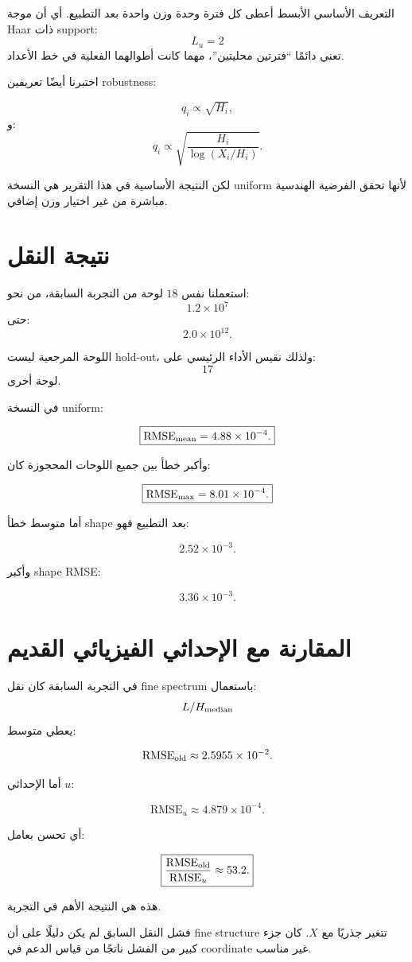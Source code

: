 \documentclass[12pt]{article}
\begin{document}
التعريف الأساسي الأبسط أعطى كل فترة وحدة وزن واحدة بعد التطبيع.
أي أن موجة Haar ذات support:
\[
L_u=2
\]
تعني دائمًا ``فترتين محليتين''، مهما كانت أطوالهما الفعلية في خط الأعداد.

اختبرنا أيضًا تعريفين robustness:

\[
q_i\propto\sqrt{H_i},
\]
و:
\[
q_i
\propto
\sqrt{
\frac{H_i}{
\log(X_i/H_i)
}
}.
\]

لكن النتيجة الأساسية في هذا التقرير هي النسخة uniform لأنها تحقق الفرضية
الهندسية مباشرة من غير اختيار وزن إضافي.

\section{نتيجة النقل}

استعملنا نفس \(18\) لوحة من التجربة السابقة، من نحو:
\[
1.2\times10^7
\]
حتى:
\[
2.0\times10^{12}.
\]

اللوحة المرجعية ليست hold-out، ولذلك نقيس الأداء الرئيسي على:
\[
17
\]
لوحة أخرى.

في النسخة uniform:

\[
\boxed{
\mathrm{RMSE}_{\rm mean}
=
4.88\times10^{-4}.
}
\]

وأكبر خطأ بين جميع اللوحات المحجوزة كان:

\[
\boxed{
\mathrm{RMSE}_{\rm max}
=
8.01\times10^{-4}.
}
\]

أما متوسط خطأ shape بعد التطبيع فهو:

\[
\boxed{
2.52\times10^{-3}.
}
\]

وأكبر shape RMSE:

\[
3.36\times10^{-3}.
\]

\section{المقارنة مع الإحداثي الفيزيائي القديم}

في التجربة السابقة كان نقل fine spectrum باستعمال:
\[
L/H_{\rm median}
\]
يعطي متوسط:

\[
\mathrm{RMSE}_{\rm old}
\approx
2.5955\times10^{-2}.
\]

أما الإحداثي \(u\):

\[
\mathrm{RMSE}_{u}
\approx
4.879\times10^{-4}.
\]

أي تحسن بعامل:

\[
\boxed{
\frac{
\mathrm{RMSE}_{\rm old}
}{
\mathrm{RMSE}_{u}
}
\approx53.2.
}
\]

هذه هي النتيجة الأهم في التجربة.

فشل النقل السابق لم يكن دليلًا على أن fine structure تتغير جذريًا مع \(X\).
كان جزء كبير من الفشل ناتجًا من قياس الدعم في coordinate غير مناسب.
\end{document}
